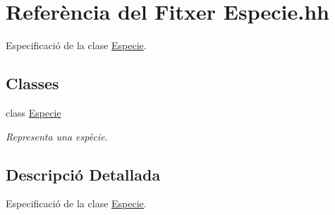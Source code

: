 \hypertarget{_especie_8hh}{}\section{Referència del Fitxer Especie.\+hh}
\label{_especie_8hh}


Especificació de la clase \hyperlink{class_especie}{Especie}.  


\subsection*{Classes}
\begin{DoxyCompactItemize}
\item 
class \hyperlink{class_especie}{Especie}
\begin{DoxyCompactList}\small\item\em Representa una espècie. \end{DoxyCompactList}\end{DoxyCompactItemize}


\subsection{Descripció Detallada}
Especificació de la clase \hyperlink{class_especie}{Especie}. 

